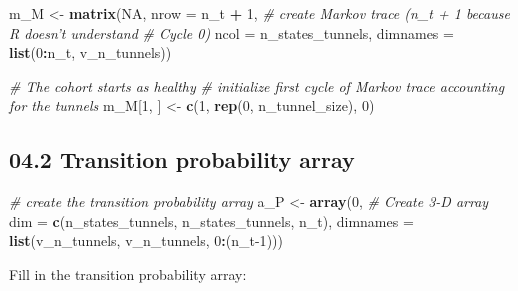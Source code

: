 \documentclass[
]{article}
\newenvironment{Shaded}{\begin{snugshade}}{\end{snugshade}}
\newcommand{\CommentTok}[1]{\textcolor[rgb]{0.56,0.35,0.01}{\textit{#1}}}
\newcommand{\DataTypeTok}[1]{\textcolor[rgb]{0.13,0.29,0.53}{#1}}
\newcommand{\DecValTok}[1]{\textcolor[rgb]{0.00,0.00,0.81}{#1}}
\newcommand{\KeywordTok}[1]{\textcolor[rgb]{0.13,0.29,0.53}{\textbf{#1}}}
\newcommand{\NormalTok}[1]{#1}
\newcommand{\OperatorTok}[1]{\textcolor[rgb]{0.81,0.36,0.00}{\textbf{#1}}}
\newcommand{\OtherTok}[1]{\textcolor[rgb]{0.56,0.35,0.01}{#1}}
\newcommand{\StringTok}[1]{\textcolor[rgb]{0.31,0.60,0.02}{#1}}
\begin{document}
\begin{Shaded}
\begin{Highlighting}[]
\NormalTok{m_M <-}\StringTok{ }\KeywordTok{matrix}\NormalTok{(}\OtherTok{NA}\NormalTok{, }
              \DataTypeTok{nrow =}\NormalTok{ n_t }\OperatorTok{+}\StringTok{ }\DecValTok{1}\NormalTok{,  }\CommentTok{# create Markov trace (n_t + 1 because R doesn't understand }
                               \CommentTok{# Cycle 0)}
              \DataTypeTok{ncol =}\NormalTok{ n_states_tunnels,                  }
              \DataTypeTok{dimnames =} \KeywordTok{list}\NormalTok{(}\DecValTok{0}\OperatorTok{:}\NormalTok{n_t, v_n_tunnels)) }

\CommentTok{# The cohort starts as healthy}
\CommentTok{# initialize first cycle of Markov trace accounting for the tunnels}
\NormalTok{m_M[}\DecValTok{1}\NormalTok{, ] <-}\StringTok{ }\KeywordTok{c}\NormalTok{(}\DecValTok{1}\NormalTok{, }\KeywordTok{rep}\NormalTok{(}\DecValTok{0}\NormalTok{, n_tunnel_size), }\DecValTok{0}\NormalTok{)     }
\end{Highlighting}
\end{Shaded}

\hypertarget{transition-probability-array}{%
\subsection{04.2 Transition probability
array}\label{transition-probability-array}}

\begin{Shaded}
\begin{Highlighting}[]
\CommentTok{# create the transition probability array}
\NormalTok{a_P <-}\StringTok{ }\KeywordTok{array}\NormalTok{(}\DecValTok{0}\NormalTok{,                                          }\CommentTok{# Create 3-D array}
             \DataTypeTok{dim =} \KeywordTok{c}\NormalTok{(n_states_tunnels, n_states_tunnels, n_t),               }
             \DataTypeTok{dimnames =} \KeywordTok{list}\NormalTok{(v_n_tunnels, v_n_tunnels, }\DecValTok{0}\OperatorTok{:}\NormalTok{(n_t}\DecValTok{-1}\NormalTok{)))  }
\end{Highlighting}
\end{Shaded}

Fill in the transition probability array:
\end{document}

